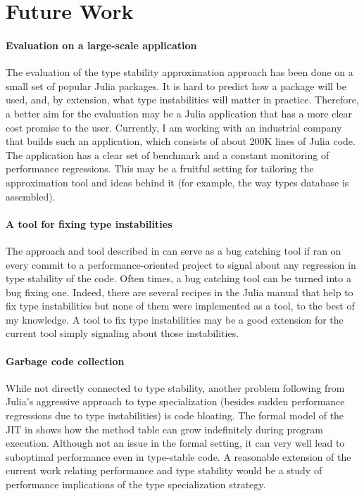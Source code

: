 \section{Future Work}

\paragraph{Evaluation on a large-scale application} The
evaluation of the type stability approximation approach has been done on a small
set of popular Julia packages. It is hard to predict how a package will be used,
and, by extension, what type instabilities will matter in practice. Therefore, a
better aim for the evaluation may be a Julia application that has a more clear
cost promise to the user. Currently, I am working with an industrial company
that builds such an application, which consists of about 200K lines of Julia
code. The application has a clear set of benchmark and a constant monitoring of
performance regressions. This may be a fruitful setting for tailoring the
approximation tool and ideas behind it (for example, the way types database
is assembled).

\paragraph{A tool for fixing type instabilities} The approach and tool described in
 can serve as a bug catching tool if ran on every
commit to a performance-oriented project to signal about any regression in type
stability of the code. Often times, a bug catching tool can be turned into a bug
fixing one. Indeed, there are several recipes in the Julia manual that help to
fix type instabilities but none of them were implemented as a tool, to the best
of my knowledge. A tool to fix type instabilities may be a good extension for
the current tool simply signaling about those instabilities.

\paragraph{Garbage code collection} While not directly connected to type
stability, another problem following from Julia's aggressive approach to type
specialization (besides sudden performance regressions due to type
instabilities) is code bloating. The formal model of the JIT in
 shows how the method table can grow indefinitely during
program execution. Although not an issue in the formal setting,  it can very
well lead to suboptimal performance even in type-stable code. A reasonable
extension of the current work relating performance and type stability would be a
study of performance implications of the type specialization strategy.
